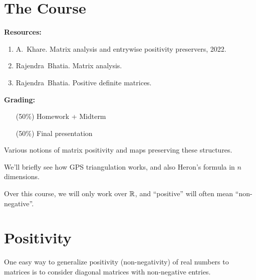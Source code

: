 \chapter*{The Course}

\textbf{Resources:}
\begin{enumerate}
    \item A.~Khare. Matrix analysis and entrywise positivity preservers, 2022.
    \item Rajendra~Bhatia. Matrix analysis.
    \item Rajendra~Bhatia. Positive definite matrices.
\end{enumerate}

\textbf{Grading:}
\begin{itemize}
    \item[(50\%)] Homework + Midterm
    \item[(50\%)] Final presentation
\end{itemize}

\begin{center}
    Various notions of matrix positivity and maps preserving these structures.
\end{center}
We'll briefly see how GPS triangulation works, and also Heron's formula in
$n$ dimensions.

Over this course, we will only work over $\mathbb{R}$, and ``positive'' will often
mean ``non-negative''.

\chapter{Positivity}
One easy way to generalize positivity (non-negativity) of real numbers to
matrices is to consider diagonal matrices with non-negative entries.


